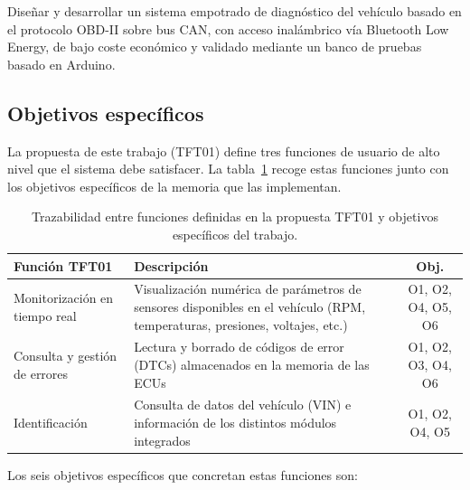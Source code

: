 Diseñar y desarrollar un sistema empotrado de diagnóstico del vehículo basado en el protocolo OBD-II sobre bus CAN, con acceso inalámbrico vía Bluetooth Low Energy, de bajo coste económico y validado mediante un banco de pruebas basado en Arduino.

\subsection{Objetivos específicos}

La propuesta de este trabajo (TFT01) define tres funciones de usuario de alto nivel que el sistema debe satisfacer. La tabla~\ref{tab:tft01_objetivos} recoge estas funciones junto con los objetivos específicos de la memoria que las implementan.

\begin{table}[!htbp]
\caption{Trazabilidad entre funciones definidas en la propuesta TFT01 y objetivos específicos del trabajo.}
\label{tab:tft01_objetivos}
\centering
\renewcommand{\arraystretch}{1.3}
\begin{tabular}{|p{4.2cm}|p{7.5cm}|c|}
\hline
\textbf{Función TFT01} & \textbf{Descripción} & \textbf{Obj.} \\
\hline
Monitorización en tiempo real &
  Visualización numérica de parámetros de sensores disponibles en el vehículo (RPM, temperaturas, presiones, voltajes, etc.) &
  O1, O2, O4, O5, O6 \\
\hline
Consulta y gestión de errores &
  Lectura y borrado de códigos de error (DTCs) almacenados en la memoria de las ECUs &
  O1, O2, O3, O4, O6 \\
\hline
Identificación &
  Consulta de datos del vehículo (VIN) e información de los distintos módulos integrados &
  O1, O2, O4, O5 \\
\hline
\end{tabular}
\end{table}

Los seis objetivos específicos que concretan estas funciones son:

